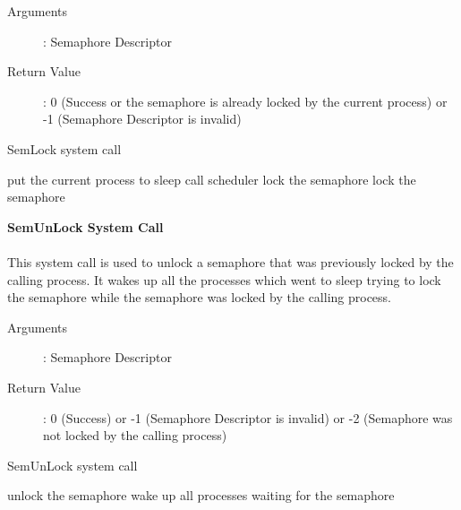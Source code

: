 \documentclass[10pt]{article}
\begin{document}
\begin{description}
\item[Arguments]: Semaphore Descriptor
\item[Return Value]: 0 (Success or the semaphore is already locked by the current process) or -1 (Semaphore Descriptor is invalid)
\end{description} 
\begin{algorithm}
\caption{SemLock system call}
\begin{algorithmic}
\ENDIF
{}
\ENDIF
{}
            \STATE put the current process to sleep
            \STATE call scheduler
        \ENDWHILE
        \STATE lock the semaphore
    \ENDIF
\ELSE
    \STATE lock the semaphore
\ENDIF
{}
\end{algorithmic}
\end{algorithm}
\vspace{3mm}
\textbf{SemUnLock System Call}
\\ \\
This system call is used to unlock a semaphore that was previously locked by the calling process. It wakes up all the processes which went to sleep trying to lock the semaphore while the semaphore was locked by the calling process. 
\begin{description}
\item[Arguments]: Semaphore Descriptor
\item[Return Value]: 0 (Success) or -1 (Semaphore Descriptor is invalid) or -2 (Semaphore was not locked by the calling process)
\end{description} 
\begin{algorithm}
\caption{SemUnLock system call}
\begin{algorithmic}
\ENDIF
{}
\ENDIF
{}
    \STATE unlock the semaphore
    \STATE wake up all processes waiting for the semaphore
\ELSE
\ENDIF
{}
\end{algorithmic}
\end{algorithm}
\vspace{8mm}
\end{document}
